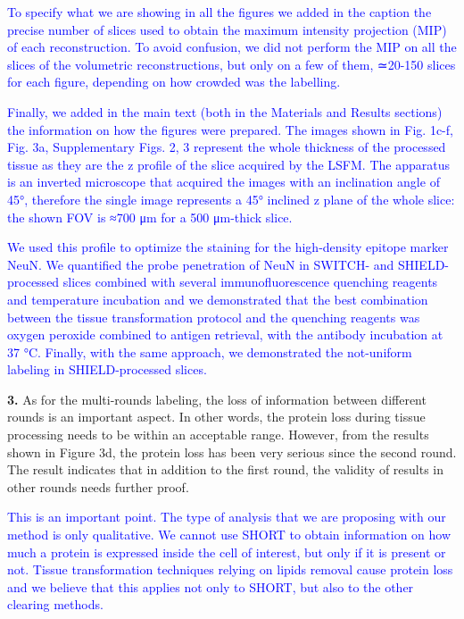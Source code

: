 \documentclass{article}
\newcommand{\reply}[1]{\textcolor{blue}{#1}}
\begin{document}
\noindent \reply{To specify what we are showing in all the figures we added in the caption the precise number of} \reply{slices used to obtain the maximum intensity projection (MIP) of each reconstruction. To avoid} \reply{confusion, we did not perform the MIP on all the slices of the volumetric reconstructions, but only} \reply{on a few of them, ≃20-150 slices for each figure, depending on how crowded was the labelling.}

\noindent \reply{Finally, we added in the main text (both in the Materials and Results sections) the information on} \reply{how the figures were prepared. The images shown in Fig. 1c-f, Fig. 3a, Supplementary Figs. 2, 3} \reply{represent the whole thickness of the processed tissue as they are the z profile of the slice acquired} \reply{by the LSFM. The apparatus is an inverted microscope that acquired the images with an inclination} \reply{angle of 45°, therefore the single image represents a 45° inclined z plane of the whole slice: the} \reply{shown FOV is ≈700 μm for a 500 μm-thick slice.}

\noindent \reply{We used this profile to optimize the staining for the high-density epitope marker NeuN. We} \reply{quantified the probe penetration of NeuN in SWITCH- and SHIELD-processed slices combined} \reply{with several immunofluorescence quenching reagents and temperature incubation and we} \reply{demonstrated that the best combination between the tissue transformation protocol and the} \reply{quenching reagents was oxygen peroxide combined to antigen retrieval, with the antibody} \reply{incubation at 37 °C. Finally, with the same approach, we demonstrated the not-uniform labeling in} \reply{SHIELD-processed slices.}

\noindent \textbf{3.} As for the multi-rounds labeling, the loss of information between different rounds is an important aspect. In other words, the protein loss during tissue processing needs to be within an acceptable range. However, from the results shown in Figure 3d, the protein loss has been very serious since the second round. The result indicates that in addition to the first round, the validity of results in other rounds needs further proof.

\noindent \reply{This is an important point. The type of analysis that we are proposing with our method is only} \reply{qualitative. We cannot use SHORT to obtain information on how much a protein is expressed} \reply{inside the cell of interest, but only if it is present or not. Tissue transformation techniques relying on} \reply{lipids removal cause protein loss and we believe that this applies not only to SHORT, but also to} \reply{the other clearing methods.}
\end{document}
